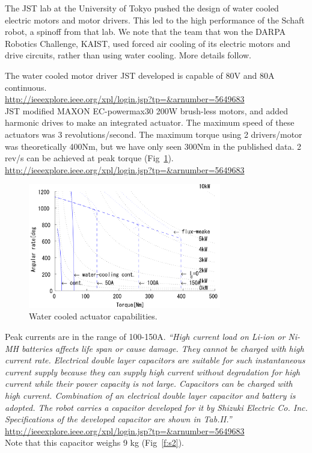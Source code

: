 \documentclass[letterpaper,12pt,fullpage]{article}
\begin{document}
The JST lab at the University of Tokyo pushed the design of water
cooled electric motors and motor drivers. This led to the high
performance of the Schaft robot, a spinoff from that lab.
We note that the team that won the DARPA Robotics Challenge, KAIST, used
forced air cooling of its electric motors and drive circuits,
rather than using water cooling. More details follow.

The water cooled motor driver JST developed is capable of 80V and
80A continuous.\\
\url{http://ieeexplore.ieee.org/xpl/login.jsp?tp=&arnumber=5649683}\\

JST modified
MAXON EC-powermax30 200W brush-less motors, and added harmonic drives
to make an integrated actuator.
The maximum speed of these actuators was 3 revolutions/second.
The maximum torque using 2 drivers/motor was theoretically 400Nm, but
we have only seen 300Nm in the published data. 2 rev/s can be achieved
at peak torque (Fig~\ref{f:s1}).\\
\url{http://ieeexplore.ieee.org/xpl/login.jsp?tp=&arnumber=5649683}\\

\begin{figure}[t]
\centering
\includegraphics[width=0.75\textwidth]{tech-figs/s1}
\caption{Water cooled actuator capabilities.}
\label{f:s1}
\end{figure}

Peak currents are in the range of 100-150A.
{\it
``High current load on Li-ion or Ni-MH batteries affects life
span or cause damage. They cannot be charged with high
current rate. Electrical double layer capacitors are suitable for
such instantaneous current supply because they can supply
high current without degradation for high current while
their power capacity is not large. Capacitors can be charged
with high current. Combination of an electrical double layer
capacitor and battery is adopted. The robot carries a capacitor
developed for it by Shizuki Electric Co. Inc. Specifications of
the developed capacitor are shown in Tab.II.''}\\
\url{http://ieeexplore.ieee.org/xpl/login.jsp?tp=&arnumber=5649683}\\
Note that this capacitor weighs 9 kg (Fig~\ref{f:s2}).
\end{document}
